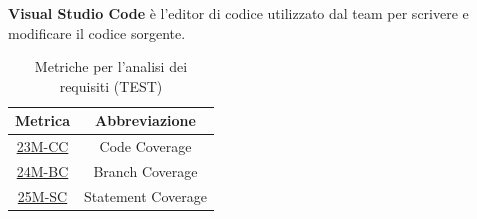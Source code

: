 \textbf{Visual Studio Code} è l'editor di codice utilizzato dal team per scrivere e modificare il codice sorgente.

\begin{table}[!h]
	\centering
	\begin{tabular}{|c|c|}
		\hline
		\textbf{Metrica}                   & \textbf{Abbreviazione} \\
		\hline
		\hyperlink{subsection.6.2}{23M-CC} & Code Coverage          \\
		\hyperlink{subsection.6.2}{24M-BC} & Branch Coverage        \\
		\hyperlink{subsection.6.2}{25M-SC} & Statement Coverage     \\
		\hline
	\end{tabular}
	\caption{Metriche per l'analisi dei requisiti (TEST)}
	\label{tab:2}
\end{table}

